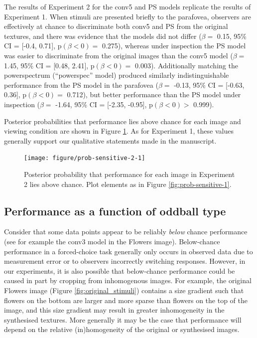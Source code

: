 \documentclass[article, 11pt,a4paper,natbib]{apa6}\usepackage[]{graphicx}\usepackage[]{color}
\newenvironment{knitrout}{}{} %
\begin{document}
The results of Experiment 2 for the conv5 and PS models replicate the results of Experiment 1. 
When stimuli are presented briefly to the parafovea, observers are effectively at chance to discriminate both conv5 and PS from the original textures, and there was evidence that the models did not differ
($\beta = $ 0.15, 95\% CI = [-0.4, 0.71], $\mathrm{p}(\beta < 0) = $ 0.275), 
whereas under inspection the PS model was easier to discriminate from the original images than the conv5 model
($\beta = $ 1.45, 95\% CI = [0.48, 2.41], $\mathrm{p}(\beta < 0) = $ 0.003).
Additionally matching the powerspectrum (``powerspec'' model) produced similarly indistinguishable performance from the PS model in the parafovea
($\beta = $ -0.13, 95\% CI = [-0.63, 0.36], $\mathrm{p}(\beta < 0) = $ 0.712),
but better performance than the PS model under inspection
($\beta = $ -1.64, 95\% CI = [-2.35, -0.95], $\mathrm{p}(\beta < 0) > $ 0.999).

Posterior probabilities that performance lies above chance for each image and viewing condition are shown in Figure \ref{fig:prob-sensitive-2}. 
As for Experiment 1, these values generally support our qualitative statements made in the manuscript.




\begin{knitrout}
\color{fgcolor}\begin{figure}
\texttt{[image: figure/prob-sensitive-2-1]} \caption{Posterior probability that performance for each image in Experiment 2 lies above chance.
              Plot elements as in Figure \ref{fig:prob-sensitive-1}.}\label{fig:prob-sensitive-2}
\end{figure}


\end{knitrout}

\subsection{Performance as a function of oddball type}

Consider that some data points appear to be reliably \textit{below} chance performance (see for example the conv3 model in the Flowers image).
Below-chance performance in a forced-choice task generally only occurs in observed data due to measurement error or to observers incorrectly switching responses.
However, in our experiments, it is also possible that below-chance performance could be caused in part by cropping from inhomogenous images. 
For example, the original Flowers image (Figure \ref{fig:original_stimuli}) contains a size gradient such that flowers on the bottom are larger and more sparse than flowers on the top of the image, and this size gradient may result in greater inhomogeneity in the synthesised textures.
More generally it may be the case that performance will depend on the relative (in)homogeneity of the original or synthesised images.
\end{document}
